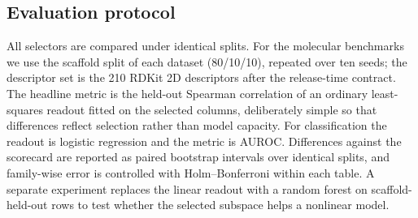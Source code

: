 \subsection{Evaluation protocol}

All selectors are compared under identical splits. For the molecular benchmarks
we use the scaffold split of each dataset (80/10/10), repeated over ten seeds; the
descriptor set is the 210 RDKit 2D descriptors after the release-time contract.
The headline metric is the held-out Spearman correlation of an ordinary
least-squares readout fitted on the selected columns, deliberately simple so that
differences reflect selection rather than model capacity. For classification the
readout is logistic regression and the metric is AUROC. Differences against the
scorecard are reported as paired bootstrap intervals over identical splits, and
family-wise error is controlled with Holm--Bonferroni within each table. A
separate experiment replaces the linear readout with a random forest on
scaffold-held-out rows to test whether the selected subspace helps a nonlinear
model.
